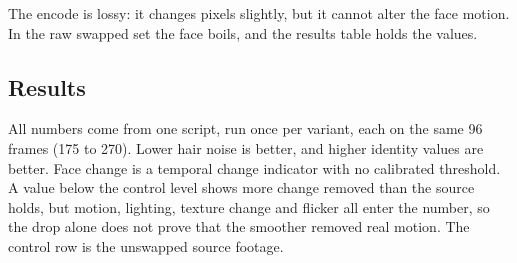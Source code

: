 The encode is lossy: it changes pixels slightly, but it cannot alter the face motion. In the raw swapped set the face boils, and the results table holds the values.


\subsection{Results}
All numbers come from one script, run once per variant, each on the same 96 frames (175 to 270). Lower hair noise is better, and higher identity values are better. Face change is a temporal change indicator with no calibrated threshold. A value below the control level shows more change removed than the source holds, but motion, lighting, texture change and flicker all enter the number, so the drop alone does not prove that the smoother removed real motion. The control row is the unswapped source footage.

